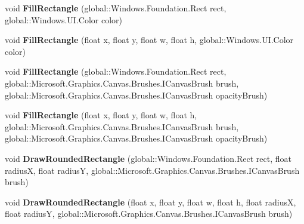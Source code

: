 \begin{DoxyCompactItemize}
void {\bfseries Fill\+Rectangle} (global\+::\+Windows.\+Foundation.\+Rect rect, global\+::\+Windows.\+U\+I.\+Color color)
\item 
\mbox{\label{class_microsoft_1_1_graphics_1_1_canvas_1_1_canvas_drawing_session_a7237b5a6e0d65c95b583831a80e8e418}} 
void {\bfseries Fill\+Rectangle} (float x, float y, float w, float h, global\+::\+Windows.\+U\+I.\+Color color)
\item 
\mbox{\label{class_microsoft_1_1_graphics_1_1_canvas_1_1_canvas_drawing_session_ae26154a13a5d4619e7c4a68d42661c26}} 
void {\bfseries Fill\+Rectangle} (global\+::\+Windows.\+Foundation.\+Rect rect, global\+::\+Microsoft.\+Graphics.\+Canvas.\+Brushes.\+I\+Canvas\+Brush brush, global\+::\+Microsoft.\+Graphics.\+Canvas.\+Brushes.\+I\+Canvas\+Brush opacity\+Brush)
\item 
\mbox{\label{class_microsoft_1_1_graphics_1_1_canvas_1_1_canvas_drawing_session_a78cb91ee7683e0cbcbaee5f78e683611}} 
void {\bfseries Fill\+Rectangle} (float x, float y, float w, float h, global\+::\+Microsoft.\+Graphics.\+Canvas.\+Brushes.\+I\+Canvas\+Brush brush, global\+::\+Microsoft.\+Graphics.\+Canvas.\+Brushes.\+I\+Canvas\+Brush opacity\+Brush)
\item 
\mbox{\label{class_microsoft_1_1_graphics_1_1_canvas_1_1_canvas_drawing_session_a1644619e4f8a2a59e186364cbac40657}} 
void {\bfseries Draw\+Rounded\+Rectangle} (global\+::\+Windows.\+Foundation.\+Rect rect, float radiusX, float radiusY, global\+::\+Microsoft.\+Graphics.\+Canvas.\+Brushes.\+I\+Canvas\+Brush brush)
\item 
\mbox{\label{class_microsoft_1_1_graphics_1_1_canvas_1_1_canvas_drawing_session_abf45229c504fd79de125759c0a2d40ac}} 
void {\bfseries Draw\+Rounded\+Rectangle} (float x, float y, float w, float h, float radiusX, float radiusY, global\+::\+Microsoft.\+Graphics.\+Canvas.\+Brushes.\+I\+Canvas\+Brush brush)
\item 
\mbox{\label{class_microsoft_1_1_graphics_1_1_canvas_1_1_canvas_drawing_session_ad0090a1bc18862831736335ce44c8ebb}} 

\end{DoxyCompactItemize}
